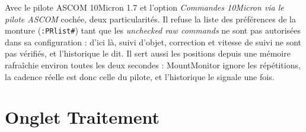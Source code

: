 Avec le pilote ASCOM 10Micron 1.7 et l'option \emph{Commandes 10Micron via le
pilote ASCOM} cochée, deux particularités. Il refuse la liste des
préférences de la monture (\texttt{:PRlist\#}) tant que les \emph{unchecked
raw commands} ne sont pas autorisées dans sa configuration : d'ici là, suivi
d'objet, correction et vitesse de suivi ne sont pas vérifiés, et l'historique
le dit. Il sert aussi les positions depuis une mémoire rafraîchie environ toutes
les deux secondes : MountMonitor ignore les répétitions, la cadence réelle est
donc celle du pilote, et l'historique le signale une fois.

\needspace{0.6\textheight}
\section{Onglet Traitement}


